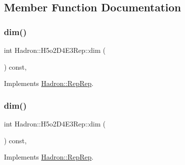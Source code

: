 \subsection{Member Function Documentation}
\mbox{\label{structHadron_1_1H5o2D4E3Rep_a581ae4c5439a622f1ae9d8ed2c0acab3}} 
\subsubsection{\texorpdfstring{dim()}{dim()}\hspace{0.1cm}{\footnotesize\ttfamily [1/5]}}
{\footnotesize\ttfamily int Hadron\+::\+H5o2\+D4\+E3\+Rep\+::dim (\begin{DoxyParamCaption}{ }\end{DoxyParamCaption}) const\hspace{0.3cm}{\ttfamily [inline]}, {\ttfamily [virtual]}}



Implements \mbox{\hyperlink{structHadron_1_1RepRep_a92c8802e5ed7afd7da43ccfd5b7cd92b}{Hadron\+::\+Rep\+Rep}}.

\mbox{\label{structHadron_1_1H5o2D4E3Rep_a581ae4c5439a622f1ae9d8ed2c0acab3}} 
\subsubsection{\texorpdfstring{dim()}{dim()}\hspace{0.1cm}{\footnotesize\ttfamily [2/5]}}
{\footnotesize\ttfamily int Hadron\+::\+H5o2\+D4\+E3\+Rep\+::dim (\begin{DoxyParamCaption}{ }\end{DoxyParamCaption}) const\hspace{0.3cm}{\ttfamily [inline]}, {\ttfamily [virtual]}}



Implements \mbox{\hyperlink{structHadron_1_1RepRep_a92c8802e5ed7afd7da43ccfd5b7cd92b}{Hadron\+::\+Rep\+Rep}}.

\mbox{\label{structHadron_1_1H5o2D4E3Rep_a581ae4c5439a622f1ae9d8ed2c0acab3}} 
